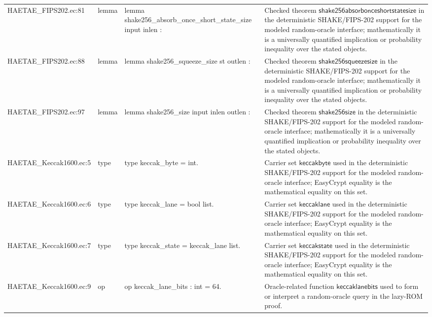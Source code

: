 \documentclass[10pt]{article}
\begin{document}
\begin{longtable}{L{0.11\textwidth}L{0.055\textwidth}L{0.385\textwidth}L{0.41\textwidth}}
HAETAE\_\allowbreak{}FIPS202.\allowbreak{}ec:\allowbreak{}81 & lemma & {\ttfamily\scriptsize lemma shake256\_\allowbreak{}absorb\_\allowbreak{}once\_\allowbreak{}short\_\allowbreak{}state\_\allowbreak{}size input inlen :} & Checked theorem $\mathsf{shake256absorbonceshortstatesize}$ in the deterministic SHAKE/FIPS-202 support for the modeled random-oracle interface; mathematically it is a universally quantified implication or probability inequality over the stated objects. \\
HAETAE\_\allowbreak{}FIPS202.\allowbreak{}ec:\allowbreak{}88 & lemma & {\ttfamily\scriptsize lemma shake256\_\allowbreak{}squeeze\_\allowbreak{}size st outlen :} & Checked theorem $\mathsf{shake256squeezesize}$ in the deterministic SHAKE/FIPS-202 support for the modeled random-oracle interface; mathematically it is a universally quantified implication or probability inequality over the stated objects. \\
HAETAE\_\allowbreak{}FIPS202.\allowbreak{}ec:\allowbreak{}97 & lemma & {\ttfamily\scriptsize lemma shake256\_\allowbreak{}size input inlen outlen :} & Checked theorem $\mathsf{shake256size}$ in the deterministic SHAKE/FIPS-202 support for the modeled random-oracle interface; mathematically it is a universally quantified implication or probability inequality over the stated objects. \\
HAETAE\_\allowbreak{}Keccak1600.\allowbreak{}ec:\allowbreak{}5 & type & {\ttfamily\scriptsize type keccak\_\allowbreak{}byte = int.} & Carrier set $\mathsf{keccakbyte}$ used in the deterministic SHAKE/FIPS-202 support for the modeled random-oracle interface; EasyCrypt equality is the mathematical equality on this set. \\
HAETAE\_\allowbreak{}Keccak1600.\allowbreak{}ec:\allowbreak{}6 & type & {\ttfamily\scriptsize type keccak\_\allowbreak{}lane = bool list.} & Carrier set $\mathsf{keccaklane}$ used in the deterministic SHAKE/FIPS-202 support for the modeled random-oracle interface; EasyCrypt equality is the mathematical equality on this set. \\
HAETAE\_\allowbreak{}Keccak1600.\allowbreak{}ec:\allowbreak{}7 & type & {\ttfamily\scriptsize type keccak\_\allowbreak{}state = keccak\_\allowbreak{}lane list.} & Carrier set $\mathsf{keccakstate}$ used in the deterministic SHAKE/FIPS-202 support for the modeled random-oracle interface; EasyCrypt equality is the mathematical equality on this set. \\
HAETAE\_\allowbreak{}Keccak1600.\allowbreak{}ec:\allowbreak{}9 & op & {\ttfamily\scriptsize op keccak\_\allowbreak{}lane\_\allowbreak{}bits : int = 64.} & Oracle-related function $\mathsf{keccaklanebits}$ used to form or interpret a random-oracle query in the lazy-ROM proof. \\

\end{longtable}
\end{document}
